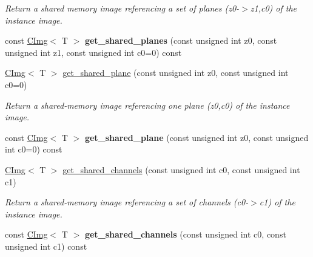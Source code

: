 \begin{DoxyCompactItemize}
\begin{DoxyCompactList}\small\item\em Return a shared memory image referencing a set of planes (z0-\/$>$z1,c0) of the instance image. \item\end{DoxyCompactList}\item 
\hypertarget{structcimg__library_1_1CImg_a2c6f0ed63c3bea80467d00893e79e7b5}{
const \hyperlink{structcimg__library_1_1CImg}{CImg}$<$ T $>$ {\bfseries get\_\-shared\_\-planes} (const unsigned int z0, const unsigned int z1, const unsigned int c0=0) const }
\label{structcimg__library_1_1CImg_a2c6f0ed63c3bea80467d00893e79e7b5}

\item 
\hypertarget{structcimg__library_1_1CImg_a8326845e26d3f01a3cdcf6d5332ad6bc}{
\hyperlink{structcimg__library_1_1CImg}{CImg}$<$ T $>$ \hyperlink{structcimg__library_1_1CImg_a8326845e26d3f01a3cdcf6d5332ad6bc}{get\_\-shared\_\-plane} (const unsigned int z0, const unsigned int c0=0)}
\label{structcimg__library_1_1CImg_a8326845e26d3f01a3cdcf6d5332ad6bc}

\begin{DoxyCompactList}\small\item\em Return a shared-\/memory image referencing one plane (z0,c0) of the instance image. \item\end{DoxyCompactList}\item 
\hypertarget{structcimg__library_1_1CImg_a925aea550f4197c5e6ae93640b53b484}{
const \hyperlink{structcimg__library_1_1CImg}{CImg}$<$ T $>$ {\bfseries get\_\-shared\_\-plane} (const unsigned int z0, const unsigned int c0=0) const }
\label{structcimg__library_1_1CImg_a925aea550f4197c5e6ae93640b53b484}

\item 
\hypertarget{structcimg__library_1_1CImg_accedfde476f75648a7a3183862c6c543}{
\hyperlink{structcimg__library_1_1CImg}{CImg}$<$ T $>$ \hyperlink{structcimg__library_1_1CImg_accedfde476f75648a7a3183862c6c543}{get\_\-shared\_\-channels} (const unsigned int c0, const unsigned int c1)}
\label{structcimg__library_1_1CImg_accedfde476f75648a7a3183862c6c543}

\begin{DoxyCompactList}\small\item\em Return a shared-\/memory image referencing a set of channels (c0-\/$>$c1) of the instance image. \item\end{DoxyCompactList}\item 
\hypertarget{structcimg__library_1_1CImg_ac4ed10f7dc82b10db0d0f4c249e73bf7}{
const \hyperlink{structcimg__library_1_1CImg}{CImg}$<$ T $>$ {\bfseries get\_\-shared\_\-channels} (const unsigned int c0, const unsigned int c1) const }
\label{structcimg__library_1_1CImg_ac4ed10f7dc82b10db0d0f4c249e73bf7}


\end{DoxyCompactItemize}
